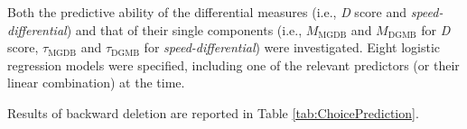 \documentclass[12pt]{book}
\begin{document}
Both the predictive ability of the differential measures (i.e., \emph{D} score and \emph{speed-differential}) and that of their single components (i.e., $M_{\text{MGDB}}$ and $M_{\text{DGMB}}$ for \emph{D} score, $\tau_{\text{MGDB}}$ and $\tau_{\text{DGMB}}$ for \emph{speed-differential}) were investigated. 
Eight logistic regression models were specified, including one of the relevant predictors (or their linear combination) at the time.

Results of backward deletion are reported in Table \ref{tab:ChoicePrediction}.
\end{document}
